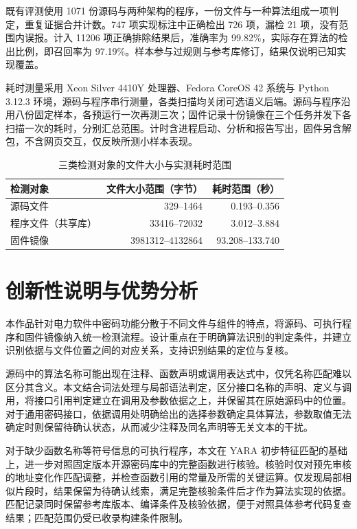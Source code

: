 既有评测使用 1071 份源码与两种架构的程序，一份文件与一种算法组成一项判定，重复证据合并计数。747 项实现标注中正确检出 726 项，漏检 21 项，没有范围内误报。计入 11206 项正确排除结果后，准确率为 99.82\%，实际存在算法的检出比例，即召回率为 97.19\%。样本参与过规则与参考库修订，结果仅说明已知实现覆盖。

耗时测量采用 Xeon Silver 4410Y 处理器、Fedora CoreOS 42 系统与 Python 3.12.3 环境，源码与程序串行测量，各类扫描均关闭可选语义后端。源码与程序沿用八份固定样本，各预运行一次再测三次；固件记录十份镜像在三个任务并发下各扫描一次的耗时，分别汇总范围。计时含进程启动、分析和报告写出，固件另含解包，不含网页交互，仅反映所测小样本表现。

\begin{table}[htbp]\centering\small
\caption{三类检测对象的文件大小与实测耗时范围}\label{tab:implemented-scope}
\begin{tabularx}{\linewidth}{@{}Xrr@{}}\toprule
检测对象 & 文件大小范围（字节） & 耗时范围（秒）\\\midrule
源码文件 & 329--1464 & 0.193--0.356\\
程序文件（共享库） & 33416--72032 & 3.012--3.884\\
固件镜像 & 3981312--4132864 & 93.208--133.740\\\bottomrule
\end{tabularx}
\end{table}

\clearpage
\section{创新性说明与优势分析}
本作品针对电力软件中密码功能分散于不同文件与组件的特点，将源码、可执行程序和固件镜像纳入统一检测流程。设计重点在于明确算法识别的判定条件，并建立识别依据与文件位置之间的对应关系，支持识别结果的定位与复核。

源码中的算法名称可能出现在注释、函数声明或调用表达式中，仅凭名称匹配难以区分其含义。本文结合词法处理与局部语法判定，区分接口名称的声明、定义与调用，将接口引用判定建立在调用及参数依据之上，并保留其在原始源码中的位置。对于通用密码接口，依据调用处明确给出的选择参数确定具体算法，参数取值无法确定时则保留待确认状态，从而减少注释及同名声明等无关文本的干扰。

对于缺少函数名称等符号信息的可执行程序，本文在 YARA 初步特征匹配\cite{yara-docs}的基础上，进一步对照固定版本开源密码库中的完整函数进行核验。核验时仅对预先审核的地址变化作匹配调整，并检查函数引用的常量及所需的关键运算。仅发现局部相似片段时，结果保留为待确认线索，满足完整核验条件后才作为算法实现的依据。匹配记录同时保留参考库版本、编译条件及核验依据，便于对照具体参考代码复查结果；匹配范围仍受已收录构建条件限制。

